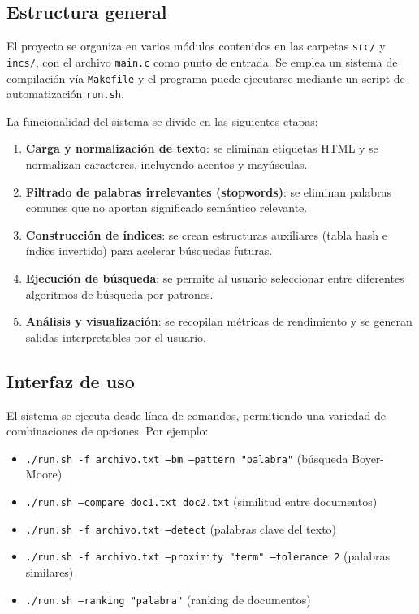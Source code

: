 \documentclass[9pt,letterpaper,onecolumn]{rho-class/rho}
\begin{document}
\subsection{Estructura general}

El proyecto se organiza en varios módulos contenidos en las carpetas \texttt{src/} y \texttt{incs/}, con el archivo \texttt{main.c} como punto de entrada. Se emplea un sistema de compilación vía \texttt{Makefile} y el programa puede ejecutarse mediante un script de automatización \texttt{run.sh}.

La funcionalidad del sistema se divide en las siguientes etapas:

\begin{enumerate}
  \item \textbf{Carga y normalización de texto}: se eliminan etiquetas HTML y se normalizan caracteres, incluyendo acentos y mayúsculas.
  \item \textbf{Filtrado de palabras irrelevantes (stopwords)}: se eliminan palabras comunes que no aportan significado semántico relevante.
  \item \textbf{Construcción de índices}: se crean estructuras auxiliares (tabla hash e índice invertido) para acelerar búsquedas futuras.
  \item \textbf{Ejecución de búsqueda}: se permite al usuario seleccionar entre diferentes algoritmos de búsqueda por patrones.
  \item \textbf{Análisis y visualización}: se recopilan métricas de rendimiento y se generan salidas interpretables por el usuario.
\end{enumerate}

\subsection{Interfaz de uso}

El sistema se ejecuta desde línea de comandos, permitiendo una variedad de combinaciones de opciones. Por ejemplo:

\begin{itemize}
  \item \texttt{./run.sh -f archivo.txt --bm --pattern "palabra"} \hfill (búsqueda Boyer-Moore)
  \item \texttt{./run.sh --compare doc1.txt doc2.txt} \hfill (similitud entre documentos)
  \item \texttt{./run.sh -f archivo.txt --detect} \hfill (palabras clave del texto)
  \item \texttt{./run.sh -f archivo.txt --proximity "term" --tolerance 2} \hfill (palabras similares)
  \item \texttt{./run.sh --ranking "palabra"} \hfill (ranking de documentos)
\end{itemize}
\end{document}

